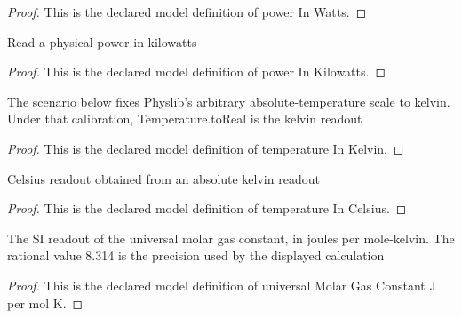 \begin{proof}
  This is the declared model definition of power In Watts.
\end{proof}
\begin{definition}
  \label{def:physics:phyx-mini-0355:phyxminiproblems-problemphyxmini0355-powerinkilowatts}
  Read a physical power in kilowatts
\end{definition}
\begin{proof}
  This is the declared model definition of power In Kilowatts.
\end{proof}
\begin{definition}
  \label{def:physics:phyx-mini-0355:phyxminiproblems-problemphyxmini0355-temperatureinkelvin}
  The scenario below fixes Physlib's arbitrary absolute-temperature scale to kelvin. Under that calibration, Temperature.toReal is the kelvin readout
\end{definition}
\begin{proof}
  This is the declared model definition of temperature In Kelvin.
\end{proof}
\begin{definition}
  \label{def:physics:phyx-mini-0355:phyxminiproblems-problemphyxmini0355-temperatureincelsius}
  Celsius readout obtained from an absolute kelvin readout
\end{definition}
\begin{proof}
  This is the declared model definition of temperature In Celsius.
\end{proof}
\begin{definition}
  \label{def:physics:phyx-mini-0355:phyxminiproblems-problemphyxmini0355-universalmolargasconstant-j-per-mol-k}
  The SI readout of the universal molar gas constant, in joules per mole-kelvin. The rational value 8.314 is the precision used by the displayed calculation
\end{definition}
\begin{proof}
  This is the declared model definition of universal Molar Gas Constant J per mol K.
\end{proof}
